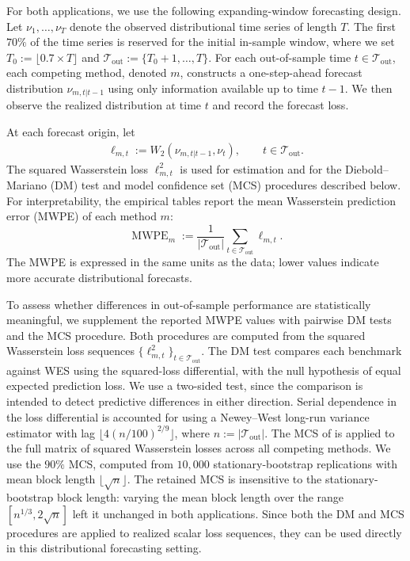 \documentclass[a4paper, 11pt]{article}
\theoremstyle{definition}
\begin{document}
For both applications, we use the following expanding-window forecasting design. 
Let $\nu_1,\ldots,\nu_T$ denote the observed distributional time series of length $T$.
The first $70\%$ of the time series is reserved for the initial in-sample window, where we set $T_0 := \lfloor 0.7 \times T \rfloor$ and $\mathcal{T}_{\mathrm{out}} := \{ T_0+1, \ldots, T \}$.
For each out-of-sample time $t \in \mathcal{T}_{\mathrm{out}}$, each competing method, denoted $m$, constructs a one-step-ahead forecast distribution $\nu_{m,t|t-1}$ using only information available up to time $t-1$. 
We then observe the realized distribution at time $t$ and record the forecast loss.

At each forecast origin, let
\begin{align}
    \ell_{m,t} := W_2\left(\nu_{m,t|t-1},\nu_t\right),
    \qquad t \in \mathcal{T}_{\mathrm{out}} .
\end{align}
The squared Wasserstein loss $\ell_{m,t}^2$ is used for estimation and for the Diebold--Mariano (DM) test \citep{diebold1995comparing} and model confidence set (MCS) procedures described below.
For interpretability, the empirical tables report the mean Wasserstein prediction error (MWPE) of each method $m$:
\begin{equation}
\label{eq:mwpe}
    \operatorname{MWPE}_m := \frac{1}{|\mathcal{T}_{\mathrm{out}}|} \sum_{t\in\mathcal{T}_{\mathrm{out}}} \ell_{m,t} .
\end{equation}
The MWPE is expressed in the same units as the data; lower values indicate more accurate distributional forecasts.

To assess whether differences in out-of-sample performance are statistically meaningful, we supplement the reported MWPE values with pairwise DM tests and the MCS procedure. 
Both procedures are computed from the squared Wasserstein loss sequences $\{\ell_{m,t}^2\}_{t \in \mathcal{T}_{\mathrm{out}}}$. 
The DM test compares each benchmark against WES using the squared-loss differential, with the null hypothesis of equal expected prediction loss. 
We use a two-sided test, since the comparison is intended to detect predictive differences in either direction. 
Serial dependence in the loss differential is accounted for using a Newey--West long-run variance estimator with lag $\lfloor 4(n/100)^{2/9}\rfloor$, where $n := |\mathcal{T}_{\mathrm{out}}|$.
The MCS of \citet{hansen2011model} is applied to the full matrix of squared Wasserstein losses across all competing methods. 
We use the $90\%$ MCS, computed from $10{,}000$ stationary-bootstrap replications with mean block length $\lfloor\sqrt n\rfloor$. 
The retained MCS is insensitive to the stationary-bootstrap block length: varying the mean block length over the range $[n^{1/3},2\sqrt n]$ left it unchanged in both applications.
Since both the DM and MCS procedures are applied to realized scalar loss sequences, they can be used directly in this distributional forecasting setting.
\end{document}
